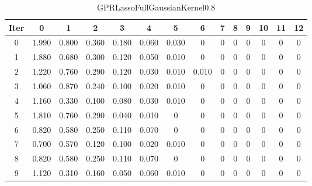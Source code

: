 \begin{table}
	\begin{center}
		\begin{tabular}{|c|c|c|c|c|c|c|c|c|c|c|c|c|c|}
			\hline
			Iter & 0 & 1 & 2 & 3 & 4 & 5 & 6 & 7 & 8 & 9 & 10 & 11 & 12 \\
			\hline
			0 & 1.990 & 0.800 & 0.360 & 0.180 & 0.060 & 0.030 & 0 & 0 & 0 & 0 & 0 & 0 & 0 \\
			\hline
			1 & 1.880 & 0.680 & 0.300 & 0.120 & 0.050 & 0.010 & 0 & 0 & 0 & 0 & 0 & 0 & 0 \\
			\hline
			2 & 1.220 & 0.760 & 0.290 & 0.120 & 0.030 & 0.010 & 0.010 & 0 & 0 & 0 & 0 & 0 & 0 \\
			\hline
			3 & 1.060 & 0.870 & 0.240 & 0.100 & 0.020 & 0.010 & 0 & 0 & 0 & 0 & 0 & 0 & 0 \\
			\hline
			4 & 1.160 & 0.330 & 0.100 & 0.080 & 0.030 & 0.010 & 0 & 0 & 0 & 0 & 0 & 0 & 0 \\
			\hline
			5 & 1.810 & 0.760 & 0.290 & 0.040 & 0.010 & 0 & 0 & 0 & 0 & 0 & 0 & 0 & 0 \\
			\hline
			6 & 0.820 & 0.580 & 0.250 & 0.110 & 0.070 & 0 & 0 & 0 & 0 & 0 & 0 & 0 & 0 \\
			\hline
			7 & 0.700 & 0.570 & 0.120 & 0.100 & 0.020 & 0.010 & 0 & 0 & 0 & 0 & 0 & 0 & 0 \\
			\hline
			8 & 0.820 & 0.580 & 0.250 & 0.110 & 0.070 & 0 & 0 & 0 & 0 & 0 & 0 & 0 & 0 \\
			\hline
			9 & 1.120 & 0.310 & 0.160 & 0.050 & 0.060 & 0.010 & 0 & 0 & 0 & 0 & 0 & 0 & 0 \\
			\hline
		\end{tabular}
	\end{center}
	\caption{GPRLassoFullGaussianKernel0.8}
\end{table}